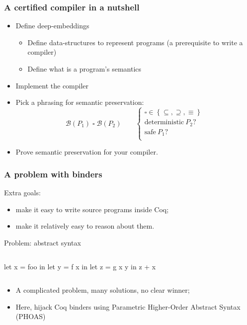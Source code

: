 \documentclass[9pt]{beamer}
\begin{document}
\begin{frame}[fragile]
  \frametitle{A certified compiler in a nutshell}
  \newcommand\behaviors[1]{{\mathcal B}\left(#1\right)}
  \begin{itemize}
  \item Define \alert{deep-embeddings}
    \begin{itemize}
    \item Define data-structures to represent programs (a prerequisite to write a compiler)
    \item Define what is a program's semantics 
    \end{itemize}
  \item Implement the compiler
  \item Pick a phrasing for semantic preservation:
    \begin{displaymath}
      \behaviors{P_1} \mathbin{\square} \behaviors{P_2} 
      \qquad  \begin{cases}
        \square \in \left\{\subseteq, \supseteq, \equiv \right\} \\
        \text{deterministic}~P_2 ? \\
        \text{safe}~P_1 ? \\
      \end{cases}
    \end{displaymath}
  \item Prove semantic preservation for your compiler. 
    \pause {}
  \end{itemize}  
\end{frame}

\begin{frame}[fragile]
  \frametitle{A problem with binders}
  
  \alert{Extra goals:}
  \begin{itemize}
  \item make it easy to write source programs inside Coq;
  \item make it relatively easy to reason about them. 
  \end{itemize}

  \alert{Problem: abstract syntax}
\begin{center}
\vspace{-1em}
  \begin{columns}
\begin{ocaml}
let x = foo in 
let y = f x in 
let z = g x y in 
z + x
\end{ocaml}
\end{columns}
\end{center}

\pause 
\begin{itemize}
\item A complicated problem, many solutions, no clear winner;
\item Here, hijack Coq binders using Parametric Higher-Order
  Abstract Syntax (PHOAS)
\end{itemize}
\end{frame}
\end{document}
